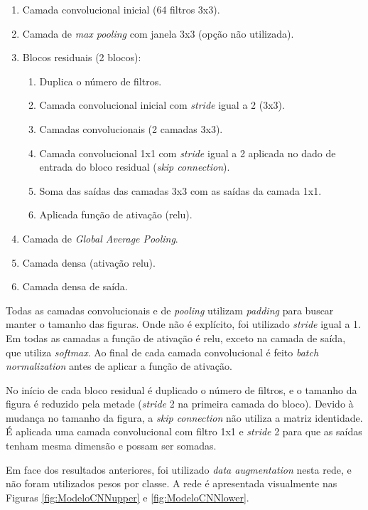 \documentclass[final,5p]{elsarticle}
\numberwithin{equation}{section}
\begin{document}
    \begin{enumerate}
        \item Camada convolucional inicial (64 filtros 3x3).
        \item Camada de \emph{max pooling} com janela 3x3 (opção não utilizada).
        \item Blocos residuais (2 blocos):
        \begin{enumerate}
            \item Duplica o número de filtros.
            \item Camada convolucional inicial com \emph{stride} igual a 2 (3x3).
            \item Camadas convolucionais (2 camadas 3x3).
            \item Camada convolucional 1x1 com \emph{stride} igual a 2 aplicada no dado de entrada do bloco residual (\emph{skip connection}).
            \item Soma das saídas das camadas 3x3 com as saídas da camada 1x1.
            \item Aplicada função de ativação (relu).
        \end{enumerate}
        \item Camada de \emph{Global Average Pooling}.
        \item Camada densa (ativação relu).
        \item Camada densa de saída.
    \end{enumerate}

    Todas as camadas convolucionais e de \emph{pooling} utilizam \emph{padding} para buscar manter o tamanho das figuras. Onde não é explícito, foi utilizado \emph{stride} igual a 1. Em todas as camadas a função de ativação é relu, exceto na camada de saída, que utiliza \emph{softmax}. Ao final de cada camada convolucional é feito \emph{batch normalization} antes de aplicar a função de ativação.

    No início de cada bloco residual é duplicado o número de filtros, e o tamanho da figura é reduzido pela metade (\emph{stride} 2 na primeira camada do bloco). Devido à mudança no tamanho da figura, a \emph{skip connection} não utiliza a matriz identidade. É aplicada uma camada convolucional com filtro 1x1 e \emph{stride} 2 para que as saídas tenham mesma dimensão e possam ser somadas.

    Em face dos resultados anteriores, foi utilizado \emph{data augmentation} nesta rede, e não foram utilizados pesos por classe. A rede é apresentada visualmente nas Figuras \ref{fig:ModeloCNNupper} e \ref{fig:ModeloCNNlower}.
\end{document}
